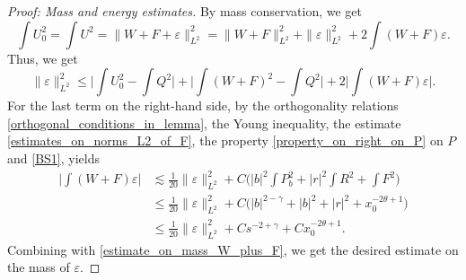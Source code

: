 \documentclass[16pt,english, oneside,reqno]{smfart}
\newcommand{\vare}{{\varepsilon}}
\begin{document}
\begin{proof}[Proof: Mass and energy estimates]
By mass conservation, we get
\begin{equation}
\int U^2_0 = \int U^2 = \|W+F+\vare\|^2_{L^2} = \|W+F\|^2_{L^2} + \|\vare\|^2_{L^2} + 2\int (W+F)\vare.
\end{equation}
Thus, we get
\begin{equation}
    \|\vare\|^2_{L^2} \leq \Big\lvert \int U^2_0 - \int Q^2\Big\rvert + \Big\lvert \int (W+F)^2 - \int Q^2\Big\rvert + 2\Big\lvert \int (W+F)\vare \Big\rvert.
\end{equation}
For the last term on the right-hand side, by the orthogonality relations \eqref{orthogonal_conditions_in_lemma}, the Young inequality, the estimate \eqref{estimates_on_norms_L2_of_F}, the property \eqref{property_on_right_on_P} on $P$ and \eqref{BS1}, yields
\begin{equation}
\begin{split}
    \Big\lvert \int (W+F)\vare \Big\rvert 
    & \lesssim \frac{1}{20}\|\vare\|^2_{L^2} + C\Big(|b|^2\int P^2_b + |r|^2\int R^2 + \int F^2 \Big) \\
    & \leq \frac{1}{20}\|\vare\|^2_{L^2} + C\Big(|b|^{2-\gamma} + |b|^2 + |r|^2 + x^{-2\theta+1}_0 \Big)\\
    & \leq \frac{1}{20}\|\vare\|^2_{L^2} + Cs^{-2+\gamma}+ Cx^{-2\theta+1}_0.
\end{split}
\end{equation}
Combining with \eqref{estimate_on_mass_W_plus_F}, we get the desired estimate on the mass of $\vare$.


\end{proof}
\end{document}
